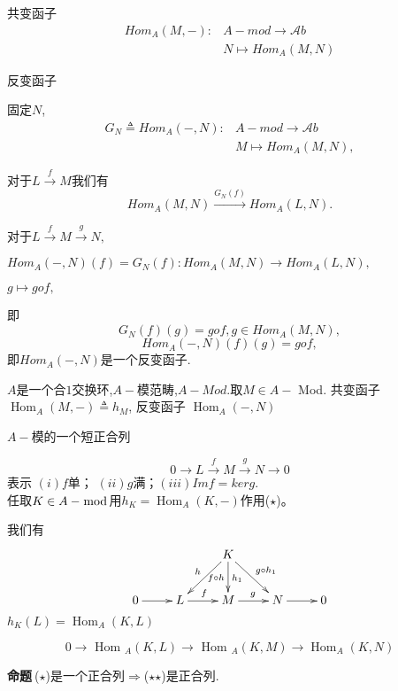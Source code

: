 \documentclass[UTF8]{article}
\begin{document}
共变函子
\[
\begin{split}
Hom_{A}(M,-):&A-mod\longrightarrow \mathscr{A}b\\
&N\longmapsto Hom_{A}(M,N)
\end{split}
\]


反变函子

固定$N$,
\[
\begin{split}
G_{N}\triangleq Hom_{A}(-,N):&A-mod\longrightarrow \mathscr{A}b\\
&M\longmapsto Hom_{A}(M,N),
\end{split}
\]

对于$L\xrightarrow{f}M$我们有
$$Hom_{A}(M,N)\xrightarrow{G_{N}(f)}Hom_{A}(L,N).$$

对于$L\xrightarrow{f}M\xrightarrow{g}N,$

$Hom_{A}(-,N)(f)=G_{N}(f):$\quad$Hom_{A}(M,N)\longrightarrow Hom_{A}(L,N),$

\qquad\qquad\qquad\qquad\qquad\qquad\qquad\qquad\qquad\quad$g\longmapsto gof,$

即
$$G_{N}(f)(g)=gof,g\in Hom_{A}(M,N),$$
$$Hom_{A}(-,N)(f)(g)=gof,$$即$Hom_{A}(-,N)$是一个反变函子.




$A$是一个合$1$交换环,$A-$模范畴,$A-Mod.$取$M \in A-$ Mod.
共变函子 $\operatorname{Hom}_{A}(M,-) \triangleq h_{M}$,
反变函子  $\operatorname{Hom}_{A}(-,N)$

$A-$模的一个短正合列

\begin{equation}
0 \stackrel{}{\longrightarrow} L \stackrel{f}{\longrightarrow} M \stackrel{g}{\longrightarrow} N
\stackrel{}{\longrightarrow} 0\tag{$\star$}
\end{equation}
表示 $(i)f$单； $(ii)g$满；$(iii)Imf=kerg$.\\
任取$K \in A-\bmod$用$h_{K}=\operatorname{Hom}_{A}\left(K,-\right)$作用($\star$)。

我们有
$$
\xymatrix{
	& & K\ar[ld]_{h}\ar[d]^{h_{1}}_{f\circ h}\ar[rd]^{g\circ h_{1}}  & &\\
	0\ar[r]&L\ar[r]^{f}&M\ar[r]^{g}&N\ar[r]&0
}
$$
$h_{K}(L)=\operatorname{Hom}_{A}\left(K, L\right)$

\begin{equation}
0 \rightarrow \text { Hom }_{A}(K, L) \rightarrow \text { Hom }_{A}(K, M) \rightarrow \operatorname{Hom}_{A}(K, N)\tag{$\star$$\star$}
\end{equation}

\textbf{命题}$\ $($\star$)是一个正合列$\Rightarrow$($\star$$\star$)是正合列.
\end{document}
